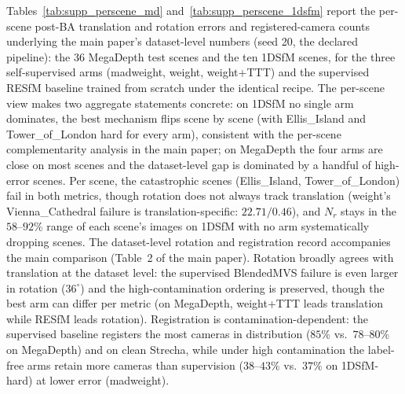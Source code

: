 \documentclass[10pt,twocolumn,letterpaper]{article}
\renewcommand{\deg}{^{\circ}}
\begin{document}
Tables~\ref{tab:supp_perscene_md} and~\ref{tab:supp_perscene_1dsfm} report the per-scene
post-BA translation and rotation errors and registered-camera counts underlying the
main paper's dataset-level numbers (seed 20, the declared pipeline): the 36 MegaDepth test scenes and the ten 1DSfM
scenes, for the three self-supervised arms (madweight, weight, weight+TTT) and the
supervised RESfM baseline trained from scratch under the identical
recipe. The per-scene view makes two aggregate statements concrete: on 1DSfM no single
arm dominates, the best mechanism flips scene by scene (with Ellis\_Island and
Tower\_of\_London hard for every arm), consistent with the per-scene complementarity
analysis in the main paper; on MegaDepth the four arms are close on most scenes and the
dataset-level gap is dominated by a handful of high-error scenes. Per scene, the
catastrophic scenes (Ellis\_Island, Tower\_of\_London) fail in both metrics, though
rotation does not always track translation (weight's Vienna\_Cathedral failure is
translation-specific: $22.71/0.46$), and $N_r$ stays in the $58$--$92\%$ range of each scene's images on 1DSfM
with no arm systematically dropping scenes.
The dataset-level rotation and registration record accompanies the main comparison (Table~2 of the main paper). Rotation broadly agrees with translation
at the dataset level: the supervised BlendedMVS failure is even larger in rotation
($36\deg$) and the high-contamination ordering is preserved, though the best arm can
differ per metric (on MegaDepth, weight+TTT leads translation while RESfM leads
rotation). Registration is contamination-dependent: the supervised baseline registers
the most cameras in distribution ($85\%$ vs.\ $78$--$80\%$ on MegaDepth) and on clean
Strecha, while under high contamination the label-free arms retain more cameras than
supervision ($38$--$43\%$ vs.\ $37\%$ on 1DSfM-hard) at lower error (madweight).
\end{document}
